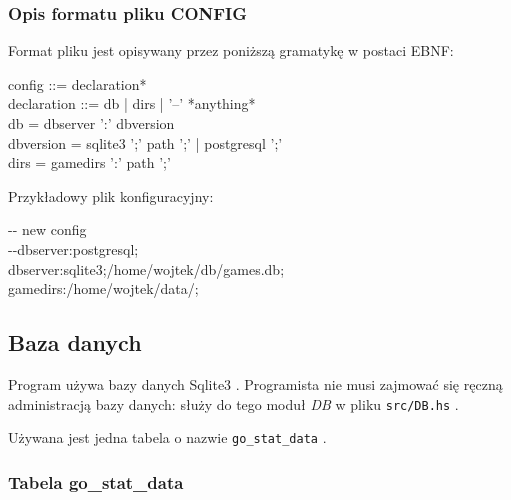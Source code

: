 \documentclass[10pt,leqno]{article}
\newcommand{\cmd}[1]{
  \texttt{#1}
}
\begin{document}
\subsubsection{Opis formatu pliku CONFIG}

Format pliku jest opisywany przez poniższą gramatykę w postaci EBNF:
\begin{framed}
\noindent config ::= declaration* \\ 
declaration ::= db | dirs | '--' *anything* \\
db = dbserver ':' dbversion \\ 
dbversion = sqlite3 ';' path ';' | postgresql ';' \\
dirs = gamedirs ':' path ';'
\end{framed}

Przykładowy plik konfiguracyjny:

\begin{framed}
\noindent \--\-- new config \\
\--\--dbserver:postgresql; \\ 
dbserver:sqlite3;/home/wojtek/db/games.db; \\
gamedirs:/home/wojtek/data/;
\end{framed}




\subsection{Baza danych}


Program używa bazy danych Sqlite3 \cite{sqlite3}. Programista nie musi zajmować
 się ręczną administracją bazy danych: służy do tego moduł \emph{DB} w pliku \cmd{src/DB.hs}. 

Używana jest jedna tabela o nazwie \cmd{go\_stat\_data}.

\subsubsection{Tabela go\_stat\_data}
\end{document}
